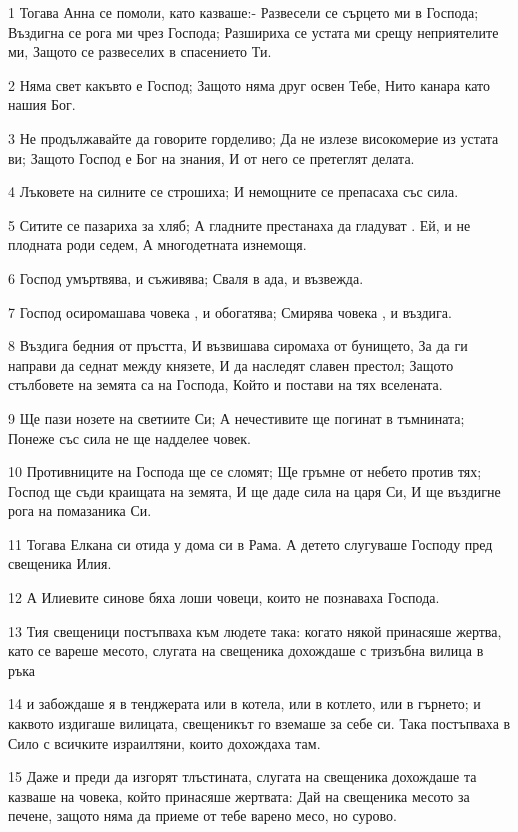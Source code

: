 \par 1 Тогава Анна се помоли, като казваше:- Развесели се сърцето ми в Господа; Въздигна се рога ми чрез Господа; Разшириха се устата ми срещу неприятелите ми, Защото се развеселих в спасението Ти.
\par 2 Няма свет какъвто е Господ; Защото няма друг освен Тебе, Нито канара като нашия Бог.
\par 3 Не продължавайте да говорите горделиво; Да не излезе високомерие из устата ви; Защото Господ е Бог на знания, И от него се претеглят делата.
\par 4 Лъковете на силните се строшиха; И немощните се препасаха със сила.
\par 5 Ситите се пазариха за хляб; А гладните престанаха да гладуват . Ей, и не плодната роди седем, А многодетната изнемощя.
\par 6 Господ умъртвява, и съживява; Сваля в ада, и възвежда.
\par 7 Господ осиромашава човека , и обогатява; Смирява човека , и въздига.
\par 8 Въздига бедния от пръстта, И възвишава сиромаха от бунището, За да ги направи да седнат между князете, И да наследят славен престол; Защото стълбовете на земята са на Господа, Който и постави на тях вселената.
\par 9 Ще пази нозете на светиите Си; А нечестивите ще погинат в тъмнината; Понеже със сила не ще надделее човек.
\par 10 Противниците на Господа ще се сломят; Ще гръмне от небето против тях; Господ ще съди краищата на земята, И ще даде сила на царя Си, И ще въздигне рога на помазаника Си.
\par 11 Тогава Елкана си отида у дома си в Рама. А детето слугуваше Господу пред свещеника Илия.
\par 12 А Илиевите синове бяха лоши човеци, които не познаваха Господа.
\par 13 Тия свещеници постъпваха към людете така: когато някой принасяше жертва, като се вареше месото, слугата на свещеника дохождаше с тризъбна вилица в ръка
\par 14 и забождаше я в тенджерата или в котела, или в котлето, или в гърнето; и каквото издигаше вилицата, свещеникът го вземаше за себе си. Така постъпваха в Сило с всичките израилтяни, които дохождаха там.
\par 15 Даже и преди да изгорят тлъстината, слугата на свещеника дохождаше та казваше на човека, който принасяше жертвата: Дай на свещеника месото за печене, защото няма да приеме от тебе варено месо, но сурово.
